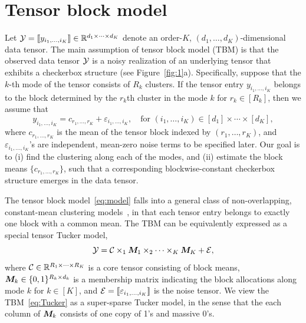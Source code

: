 \documentclass[11pt]{article}
\theoremstyle{plain}
\theoremstyle{definition}
\providecommand{\DIFaddtex}[1]{{\protect\color{blue}\uwave{#1}}} %
\providecommand{\DIFdeltex}[1]{{\protect\color{red}\sout{#1}}}                      %
\providecommand{\DIFaddbegin}{} %
\providecommand{\DIFaddend}{} %
\providecommand{\DIFdelbegin}{} %
\providecommand{\DIFdelend}{} %
\providecommand{\DIFadd}[1]{\texorpdfstring{\DIFaddtex{#1}}{#1}} %
\providecommand{\DIFdel}[1]{\texorpdfstring{\DIFdeltex{#1}}{}} %
\begin{document}
\section{Tensor block model}
\DIFaddbegin \vspace{-.1cm}
\DIFaddend Let $\mathcal{Y}=\llbracket y_{i_1,\ldots,i_K} \rrbracket\in\mathbb{R}^{d_1\times \cdots\times d_K}$ denote an order-$K$, $(d_1,\ldots,d_K)$-dimensional data tensor. The main assumption of tensor block model (TBM) is that the observed data tensor $\mathcal{Y}$ is a noisy realization of an underlying tensor that exhibits a checkerbox structure (see Figure~\ref{fig:1}a). Specifically, suppose that the $k$-th mode of the tensor consists of $R_k$ clusters. If the tensor entry $y_{i_1,\ldots,i_K}$ belongs to the block determined by the $r_k$th cluster in the mode $k$ for $r_k\in[R_k]$, then we assume that 
\begin{equation}\label{eq:model}
y_{i_1,\ldots,i_K}=c_{r_1,\ldots,r_K}+\varepsilon_{i_1,\ldots,i_K},\quad \text{for }(i_1,\ldots,i_K)\in[d_1]\times\cdots\times [d_K],
\end{equation}
where $c_{r_1,\ldots,r_K}$ is the mean of the tensor block indexed by $(r_1,\ldots,r_K)$,  and $\varepsilon_{i_1,\ldots,i_K}$'s are independent, mean-zero noise terms to be specified later. Our goal is to (i) find the clustering along each of the modes, and (ii) estimate the block means $\{c_{r_1,\ldots,r_K}\}$, such that a corresponding blockwise-constant checkerbox structure emerges in the data tensor. 

The tensor block model~\eqref{eq:model} falls into a general class of non-overlapping, constant-mean clustering models~\cite{madeira2004biclustering}, in that each tensor entry belongs to exactly one block with a common mean. The TBM can be equivalently expressed as a special tensor Tucker model,
\begin{equation}\label{eq:Tucker}
\mathcal{Y}=\mathcal{C}\times_1\bm M_1\times_2\cdots \times_K \bm M_K+\mathcal{E},
\end{equation}
where \DIFdelbegin \DIFdel{$\mathcal{C}\in\mathbb{R}^{R_1\times\cdots\times R_K}$ }\DIFdelend \DIFaddbegin \DIFadd{$\tC=\entry{c_{r_1,\ldots,r_K}}\in\mathbb{R}^{R_1\times\cdots\times R_K}$ }\DIFaddend is a core tensor consisting of block means, \DIFdelbegin \DIFdel{$\bm M_k \in\{0,1\}^{R_k\times d_k}$ }\DIFdelend \DIFaddbegin \DIFadd{$\mM_k \in\{0,1\}^{d_k\times R_k}$ }\DIFaddend is a membership matrix indicating the block allocations along mode $k$ for $k\in[K]$, and $\mathcal{E}=\llbracket \varepsilon_{i_1,\ldots,i_K} \rrbracket$ is the noise tensor. %
We view the TBM~\eqref{eq:Tucker} as a super-sparse Tucker model, in the sense that the each column of $\bm M_k$ consists of one copy of 1's and massive 0's. 
\end{document}
